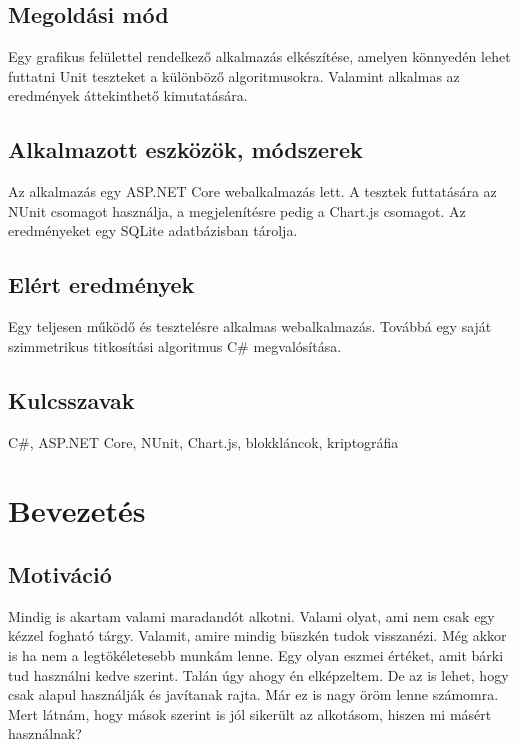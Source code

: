 \documentclass[12pt]{report} %
\begin{document}
\section*{Megoldási mód} %

Egy grafikus felülettel rendelkező alkalmazás elkészítése, amelyen könnyedén lehet futtatni Unit teszteket a különböző algoritmusokra. Valamint alkalmas az eredmények áttekinthető kimutatására.

\section*{Alkalmazott eszközök, módszerek} %

Az alkalmazás egy ASP.NET Core webalkalmazás lett. A tesztek futtatására az NUnit csomagot használja, a megjelenítésre pedig a Chart.js csomagot. Az eredményeket egy SQLite adatbázisban tárolja.

\section*{Elért eredmények} %

Egy teljesen működő és tesztelésre alkalmas webalkalmazás. Továbbá egy saját szimmetrikus titkosítási algoritmus C\# megvalósítása.

\section*{Kulcsszavak} %

C\#, ASP.NET Core, NUnit, Chart.js, blokkláncok, kriptográfia

\chapter{Bevezetés} %

\section{Motiváció} %

Mindig is akartam valami maradandót alkotni. Valami olyat, ami nem csak egy kézzel fogható tárgy. Valamit, amire mindig büszkén tudok visszanézi. Még akkor is ha nem a legtökéletesebb munkám lenne. Egy olyan eszmei értéket, amit bárki tud használni kedve szerint. Talán úgy ahogy én elképzeltem. De az is lehet, hogy csak alapul használják és javítanak rajta. Már ez is nagy öröm lenne számomra. Mert látnám, hogy mások szerint is jól sikerült az alkotásom, hiszen mi másért használnak?
\end{document}
